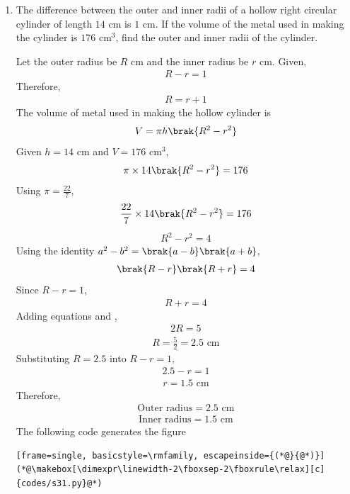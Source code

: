 \begin{enumerate}[label=\thesubsection.\arabic*, ref=\thesubsection.\theenumi]
\item
The difference between the outer and inner radii of a hollow right circular cylinder of length \(14\) cm is \(1\) cm. If the volume of the metal used in making the cylinder is \(176\text{ cm}^3\), find the outer and inner radii of the cylinder.

\solution
Let the outer radius be \(R\) cm and the inner radius be \(r\) cm.
Given,
\begin{align}
R-r=1
\end{align}
Therefore,
\begin{align}
R=r+1 \tag{1}
\end{align}
The volume of metal used in making the hollow cylinder is
\begin{align}
V=\pi h\brak{R^2-r^2}
\end{align}
Given \(h=14\) cm and \(V=176\text{ cm}^3\),
\begin{align}
\pi \times 14\brak{R^2-r^2}=176
\end{align}
Using \(\pi=\frac{22}{7}\),
\begin{align}
\frac{22}{7}\times14\brak{R^2-r^2}=176
\end{align}
\begin{align}
R^2-r^2=4
\end{align}
Using the identity \(a^2-b^2=\brak{a-b}\brak{a+b}\),
\begin{align}
\brak{R-r}\brak{R+r}=4
\end{align}
Since \(R-r=1\),
\begin{align}
R+r=4 \tag{2}
\end{align}
Adding equations  and ,
\begin{align}
2R=5
\end{align}
\begin{align}
R=\frac{5}{2}=2.5\text{ cm}
\end{align}
Substituting \(R=2.5\) into \(R-r=1\),
\begin{align}
2.5-r=1
\end{align}
\begin{align}
r=1.5\text{ cm}
\end{align}
Therefore,
\begin{align}
\text{Outer radius}=2.5\text{ cm}
\end{align}
\begin{align}
\text{Inner radius}=1.5\text{ cm}
\end{align}
The following code generates the figure
\begin{lstlisting}[frame=single, basicstyle=\rmfamily, escapeinside={(*@}{@*)}]
(*@\makebox[\dimexpr\linewidth-2\fboxsep-2\fboxrule\relax][c]{codes/s31.py}@*)
\end{lstlisting}
\begin{figure}[ht]
    \centering


\end{figure}
\end{enumerate}
